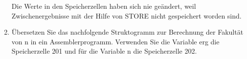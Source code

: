 \documentclass{lehramt-informatik-aufgabe}
\begin{document}
\begin{enumerate}

Die Werte in den Speicherzellen haben sich nie geändert, weil
Zwischenergebnisse mit der Hilfe von STORE nicht gespeichert worden
sind.


\item Übersetzen Sie das nachfolgende Struktogramm zur Berechnung der
Fakultät von n in ein Assemblerprogramm. Verwenden Sie die Variable erg
die Speicherzelle 201 und für die Variable n die Speicherzelle 202.


\end{enumerate}
\end{document}
